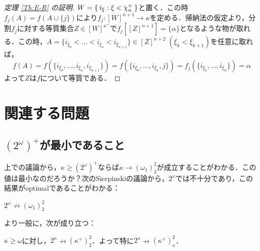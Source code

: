 \documentclass[a4paper]{bxjsarticle}
\begin{document}
\begin{proof}[定理 \ref{Th:E-R} の証明]
 $W = \Set{ i_\xi : \xi < \chi_n^+}$と置く．この時$f_j(A) = f(A \cup \{j\})$により$f_j: [W]^{n+1} \rightarrow \kappa$を定める．帰納法の仮定より，分割$f_j$に対する等質集合$Z \in [W]^{\kappa^+}$で$f_j[[Z]^{n+1}] = \{\alpha\}$となるような物が取れる．この時，$A = \{i_{\xi_0} < \dots < i_{\xi_n} < i_{\xi_{n+1}}\} \in [Z]^{n+2}\;(\xi_k < \xi_{k+1})$を任意に取れば，
 \[
  f(A) = f(\{i_{\xi_0}, \dots, i_{\xi_n}, i_{\xi_{n+1}}\})
 = f(\{i_{\xi_0}, \dots, i_{\xi_n}, j\})
 = f_j(\{i_{\xi_0}, \dots, i_{\xi_n}\}) = \alpha
 \]
 よって$Z$は$f$について等質である．\mbox{}
\end{proof}

\section{関連する問題}
\subsection{$(2^\omega)^+$が最小であること}
上での議論から，$\kappa \geq (2^\omega)^+$ならば$\kappa \longrightarrow (\omega_1)^2_2$が成立することがわかる．この値は最小なのだろうか？次のSierpinskiの議論から，$2^\omega$では不十分であり，この結果がoptimalであることがわかる：
\begin{lemma}[Sierpinski]
 $2^\omega \nrightarrow (\omega_1)^2_2$
\end{lemma}
より一般に，次が成り立つ：
\begin{lemma}[Sierpinski]
 $\kappa \geq \omega$に対し，$2^\kappa \nrightarrow (\kappa^+)^2_2$．よって特に$2^\kappa \nrightarrow (\kappa^+)^2_\kappa$．
\end{lemma}
\end{document}
